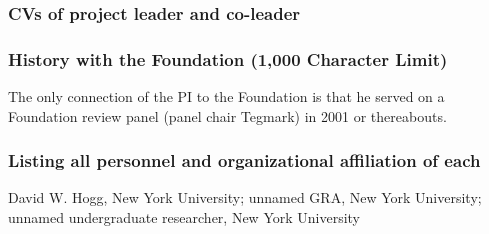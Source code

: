 \documentclass[12pt]{article}
\begin{document}
\subsubsection*{CVs of project leader and co-leader}

\subsubsection*{History with the Foundation (1,000 Character Limit)}
The only connection of the PI to the Foundation is that he served on a Foundation review panel (panel chair Tegmark) in 2001 or thereabouts.

\subsubsection*{Listing all personnel and organizational affiliation of each}
David W. Hogg, New York University; unnamed GRA, New York University; unnamed undergraduate researcher, New York University
\end{document}
